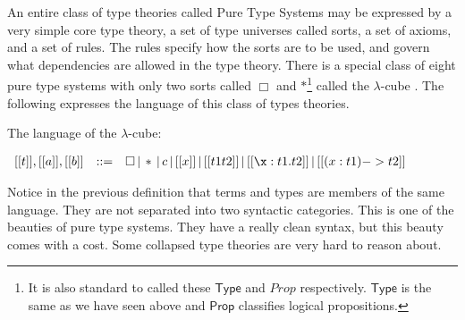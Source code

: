 An entire class of type theories called Pure Type Systems may be
expressed by a very simple core type theory, a set of type universes
called sorts, a set of axioms, and a set of rules.  The rules specify
how the sorts are to be used, and govern what dependencies are allowed
in the type theory.  There is a special class of eight pure type
systems with only two sorts called $\Box$ and $*$\footnote{ It is also
standard to called these $\mathsf{Type}$ and $Prop$ respectively.
$\mathsf{Type}$ is the same as we have seen above and $\mathsf{Prop}$
classifies logical propositions.} called the $\lambda$-cube \cite{Barendregt:1992}.  The
following expresses the language of this class of types theories.
\begin{definition}
  \label{def:pst_syntax}
  The language of the $\lambda$-cube:
  \begin{center}
    \begin{math}
      \begin{array}{lll}
        [[t]],[[a]],[[b]] & ::= & 
            \Box\,|\,*\,|\,c\,|\,[[x]]\,|\,[[t1 t2]]\,|\,[[\x:t1.t2]]\,|\,[[(x:t1)->t2]]\\
      \end{array}
    \end{math}
  \end{center}
\end{definition}
\noindent
Notice in the previous definition that terms and types are members of
the same language. They are not separated into two syntactic
categories.  This is one of the beauties of pure type systems.  They
have a really clean syntax, but this beauty comes with a cost.  Some
collapsed type theories are very hard to reason about.

